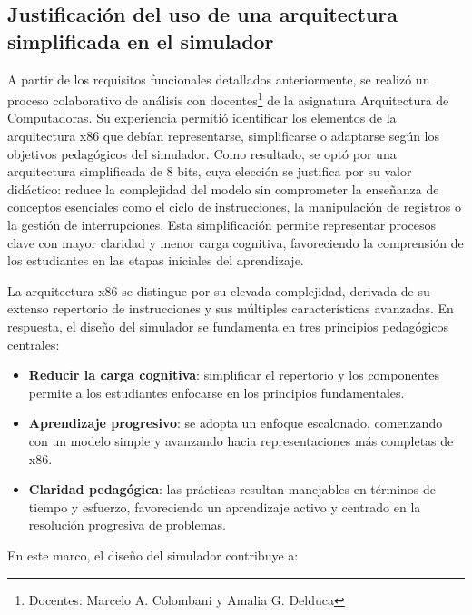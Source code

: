\documentclass[12pt,oneside]{templates/unerthesis}
\providecommand{\tightlist}{%
  \setlength{\itemsep}{0pt}\setlength{\parskip}{0pt}}
\begin{document}
\hypertarget{justificaciuxf3n-del-uso-de-una-arquitectura-simplificada-en-el-simulador}{%
\subsection{Justificación del uso de una arquitectura simplificada en el simulador}\label{justificaciuxf3n-del-uso-de-una-arquitectura-simplificada-en-el-simulador}}

A partir de los requisitos funcionales detallados anteriormente, se realizó un proceso colaborativo de análisis con docentes\footnote{Docentes: Marcelo A. Colombani y Amalia G. Delduca} de la asignatura Arquitectura de Computadoras. Su experiencia permitió identificar los elementos de la arquitectura x86 que debían representarse, simplificarse o adaptarse según los objetivos pedagógicos del simulador. Como resultado, se optó por una arquitectura simplificada de 8 bits, cuya elección se justifica por su valor didáctico: reduce la complejidad del modelo sin comprometer la enseñanza de conceptos esenciales como el ciclo de instrucciones, la manipulación de registros o la gestión de interrupciones. Esta simplificación permite representar procesos clave con mayor claridad y menor carga cognitiva, favoreciendo la comprensión de los estudiantes en las etapas iniciales del aprendizaje.

La arquitectura x86 se distingue por su elevada complejidad, derivada de su extenso repertorio de instrucciones y sus múltiples características avanzadas. En respuesta, el diseño del simulador se fundamenta en tres principios pedagógicos centrales:

\begin{itemize}
\tightlist
\item
  \textbf{Reducir la carga cognitiva}: simplificar el repertorio y los componentes permite a los estudiantes enfocarse en los principios fundamentales.\\
\item
  \textbf{Aprendizaje progresivo}: se adopta un enfoque escalonado, comenzando con un modelo simple y avanzando hacia representaciones más completas de x86.\\
\item
  \textbf{Claridad pedagógica}: las prácticas resultan manejables en términos de tiempo y esfuerzo, favoreciendo un aprendizaje activo y centrado en la resolución progresiva de problemas.
\end{itemize}

En este marco, el diseño del simulador contribuye a:
\end{document}
